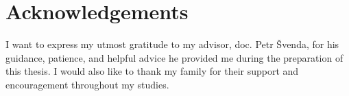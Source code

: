 \chapter*{Acknowledgements}
\noindent
I want to express my utmost gratitude to my advisor, doc. Petr Švenda, for his guidance, patience, and helpful advice he provided me during the preparation of this thesis. I would also like to thank my family for their support and encouragement throughout my studies.